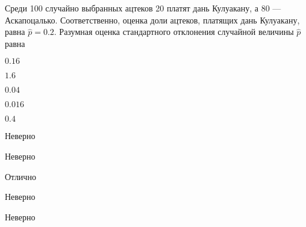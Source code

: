 
\begin{question}
Среди 100 случайно выбранных ацтеков 20 платят дань Кулуакану, а 80 ---
Аскапоцалько. Соответственно, оценка доли ацтеков, платящих дань
Кулуакану, равна \(\hat{p}=0.2\). Разумная оценка стандартного
отклонения случайной величины \(\hat{p}\) равна
\begin{answerlist}
  \item \(0.16\)
  \item \(1.6\)
  \item \(0.04\)
  \item \(0.016\)
  \item \(0.4\)
\end{answerlist}
\end{question}

\begin{solution}
\begin{answerlist}
  \item Неверно
  \item Неверно
  \item Отлично
  \item Неверно
  \item Неверно
\end{answerlist}
\end{solution}

